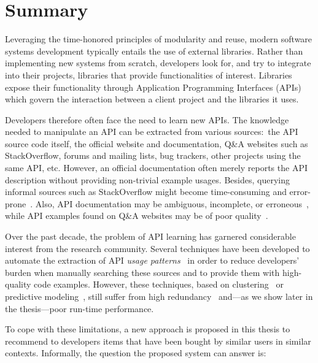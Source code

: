 

\section{Summary}
Leveraging the time-honored principles of modularity and reuse, modern software 
systems development typically entails the use of external libraries.
Rather than implementing new systems from scratch, developers look for, and try 
to integrate into their projects, libraries that provide functionalities of 
interest. Libraries expose their functionality through Application Programming 
Interfaces (APIs) which govern the interaction between a client project and the 
libraries it uses.

Developers therefore often face the need to learn new APIs.
The knowledge needed to manipulate an API can be extracted from various 
sources:~the API source code itself, the official website and documentation, 
Q\&A websites such as StackOverflow, forums and mailing lists, bug trackers, 
other projects using the same API, etc.
However, an official documentation often merely reports the API description 
without providing non-trivial example usages. Besides, querying informal 
sources such as StackOverflow might become time-consuming and 
error-prone~\cite{robillard2009makes}.
Also, API documentation may be ambiguous, incomplete, or 
erroneous~\cite{uddin2015api}, while API examples found on Q\&A websites may be 
of poor quality~\cite{nasehi2012makes}.

Over the past decade, the problem of API learning has garnered considerable 
interest from the research community.
Several techniques have been developed to automate the extraction of API 
\emph{usage patterns}~\cite{Robillard:2013:AAP:2498733.2498776} in order to 
reduce developers' burden when manually searching these sources and to provide 
them with high-quality code examples. However, these techniques, based on 
clustering~\cite{Niu2017API, Wang2013Mining, Zhong2009MAPO} or predictive 
modeling~\cite{Fowkes:2016:PPA:2950290.2950319}, still suffer from high 
redundancy~\cite{Fowkes:2016:PPA:2950290.2950319} and---as we show later in the 
thesis---poor run-time performance.

To cope with these limitations, a new approach is proposed in this thesis to 
recommend to developers items that have been bought by similar users in similar 
contexts. Informally, the question the proposed system can answer is:

